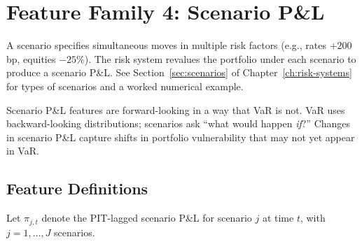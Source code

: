 \section{Feature Family 4: Scenario P\&L}
\label{sec:feat-scenario}

\begin{prereq}
A scenario specifies simultaneous moves in multiple risk factors
(e.g., rates $+200$bp, equities $-25\%$).  The risk system revalues the
portfolio under each scenario to produce a scenario P\&L.  See
Section~\ref{sec:scenarios} of Chapter~\ref{ch:risk-systems} for
types of scenarios and a worked numerical example.
\end{prereq}

Scenario P\&L features are forward-looking in a way that VaR is not.
VaR uses backward-looking distributions; scenarios ask ``what would
happen \emph{if}?''  Changes in scenario P\&L capture shifts in
portfolio vulnerability that may not yet appear in VaR.

\subsection{Feature Definitions}

Let $\pi_{j,t}$ denote the PIT-lagged scenario P\&L for scenario $j$
at time $t$, with $j = 1, \ldots, J$ scenarios.

